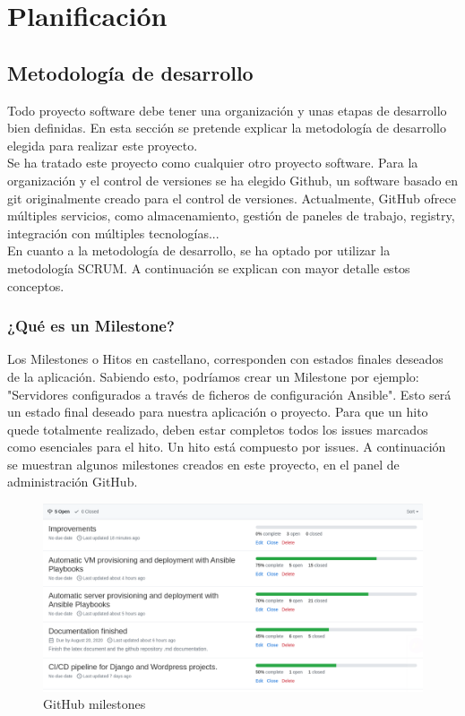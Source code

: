 \chapter {Planificación}

\section{Metodología de desarrollo}
\begin{text}
	Todo proyecto software debe tener una organización y unas etapas de desarrollo bien definidas. En esta sección se pretende explicar la metodología de desarrollo elegida para realizar este proyecto. \\
	Se ha tratado este proyecto como cualquier otro proyecto software. Para la organización y el control de versiones se ha elegido Github, un software basado en git originalmente creado para el control de versiones. Actualmente, GitHub ofrece múltiples servicios, como almacenamiento, gestión de paneles de trabajo, registry, integración con múltiples tecnologías... \\
	En cuanto a la metodología de desarrollo, se ha optado por utilizar la metodología SCRUM. A continuación se explican con mayor detalle estos conceptos.
\end{text}

\subsection{¿Qué es un Milestone?}
\label{milestones}
\begin{text}
	Los Milestones o Hitos en castellano, corresponden con estados finales deseados de la aplicación. Sabiendo esto, podríamos crear un Milestone por ejemplo: "Servidores configurados a través de ficheros de configuración Ansible". Esto será un estado final deseado para nuestra aplicación o proyecto. Para que un hito quede totalmente realizado, deben estar completos todos los issues marcados como esenciales para el hito. Un hito está compuesto por issues. A continuación se muestran algunos milestones creados en este proyecto, en el panel de administración GitHub.
	
	\begin{figure}[!hbt]
		\centering
		\includegraphics[scale=0.37]{imagenes/Analisis/milestones.png}
		\caption[GitHub milestones]{GitHub milestones}
		\label{github_milestones}
	\end{figure}
\end{text}

